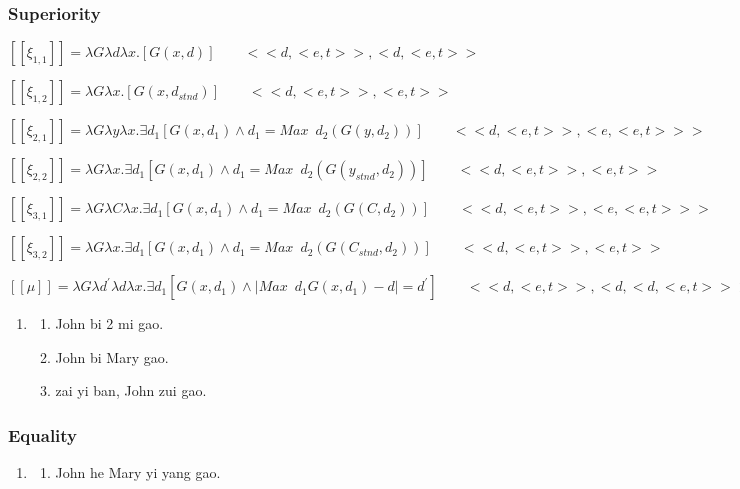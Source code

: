 \documentclass{ctexart}
\begin{document}
\subsubsection{Superiority}



$[\![\xi_{1,1}]\!]=\lambda G \lambda d \lambda x .[G(x,d)] \qquad <<d,<e,t>>,<d,<e,t>>$


$[\![\xi_{1,2}]\!]=\lambda G \lambda x .[G(x,d_{stnd})] \qquad <<d,<e,t>>,<e,t>>$

$[\![\xi_{2,1}]\!]=\lambda G \lambda y \lambda x . \exists d_1 [G(x,d_1) \land d_1=Max \enspace d_2(G(y,d_2))] \qquad <<d,<e,t>>,<e,<e,t>>>$

$[\![\xi_{2,2}]\!]=\lambda G \lambda x . \exists d_1 [G(x,d_1) \land d_1=Max \enspace d_2(G(y_{stnd},d_2))] \qquad <<d,<e,t>>,<e,t>>$

$[\![\xi_{3,1}]\!]=\lambda G \lambda C \lambda x . \exists d_1 [G(x,d_1) \land d_1=Max \enspace d_2(G(C,d_2))] \qquad <<d,<e,t>>,<e,<e,t>>>$

$[\![\xi_{3,2}]\!]=\lambda G \lambda x . \exists d_1 [G(x,d_1) \land d_1=Max \enspace d_2(G(C_{stnd},d_2))] \qquad <<d,<e,t>>,<e,t>>$


$[\![\mu]\!]=\lambda G \lambda d^{\prime} \lambda d \lambda x. \exists d_1[G(x, d_1) \land | Max \enspace d_1 G(x,d_1)-d | =d^{\prime}] \qquad <<d,<e,t>>, <d,<d,<e,t>>>>$





\begin{enumerate}[resume]
    \item
    \begin{enumerate}[ref=(\arabic{enumi}\alph*)]
        \item John bi 2 mi gao.
        \item John bi Mary gao.
        \item zai yi ban, John zui gao.
    \end{enumerate}
\end{enumerate}

\subsubsection{Equality}

\begin{enumerate}[resume]
    \item
    \begin{enumerate}[ref=(\arabic{enumi}\alph*)]
        \item John he Mary yi yang gao.
    \end{enumerate}
\end{enumerate}
\end{document}
